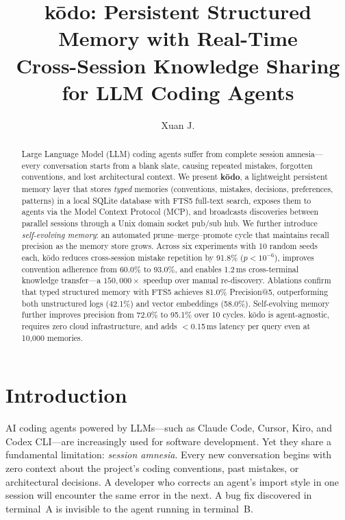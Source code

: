 \documentclass{article}
\title{k\=odo: Persistent Structured Memory with Real-Time\\Cross-Session Knowledge Sharing for LLM Coding Agents}
\author{Xuan J.}
\date{}
\begin{document}
\maketitle

\begin{abstract}
Large Language Model (LLM) coding agents suffer from complete session amnesia---every conversation starts from a blank slate, causing repeated mistakes, forgotten conventions, and lost architectural context. We present \textbf{k\=odo}, a lightweight persistent memory layer that stores \emph{typed} memories (conventions, mistakes, decisions, preferences, patterns) in a local SQLite database with FTS5 full-text search, exposes them to agents via the Model Context Protocol (MCP), and broadcasts discoveries between parallel sessions through a Unix domain socket pub/sub hub. We further introduce \emph{self-evolving memory}: an automated prune--merge--promote cycle that maintains recall precision as the memory store grows. Across six experiments with 10 random seeds each, k\=odo reduces cross-session mistake repetition by 91.8\% ($p < 10^{-6}$), improves convention adherence from 60.0\% to 93.0\%, and enables 1.2\,ms cross-terminal knowledge transfer---a $150{,}000\times$ speedup over manual re-discovery. Ablations confirm that typed structured memory with FTS5 achieves 81.0\% Precision@5, outperforming both unstructured logs (42.1\%) and vector embeddings (58.0\%). Self-evolving memory further improves precision from 72.0\% to 95.1\% over 10 cycles. k\=odo is agent-agnostic, requires zero cloud infrastructure, and adds $<$0.15\,ms latency per query even at 10{,}000 memories.
\end{abstract}

\section{Introduction}
\label{sec:intro}

AI coding agents powered by LLMs---such as Claude Code, Cursor, Kiro, and Codex CLI---are increasingly used for software development. Yet they share a fundamental limitation: \emph{session amnesia}. Every new conversation begins with zero context about the project's coding conventions, past mistakes, or architectural decisions. A developer who corrects an agent's import style in one session will encounter the same error in the next. A bug fix discovered in terminal~A is invisible to the agent running in terminal~B.
\end{document}
